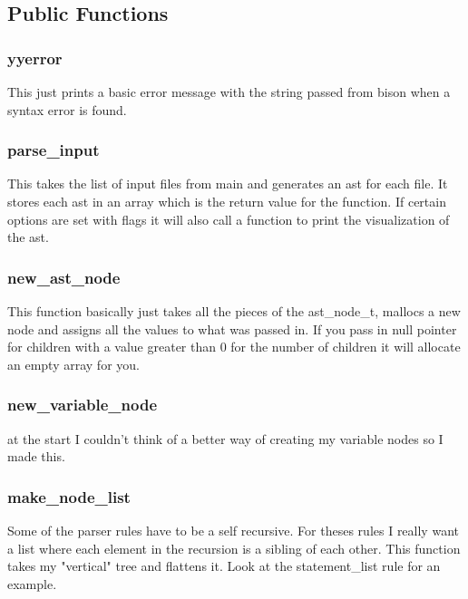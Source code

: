 \documentclass[11pt]{article}
\begin{document}
        \subsection{Public Functions}

            \subsubsection{yyerror}
                This just prints a basic error message with the string passed from bison when a syntax error is found.

            \subsubsection{parse\_input}
                This takes the list of input files from main and generates an ast for each file. It stores each ast in an array which 
                is the return value for the function. If certain options are set with flags it will also call a function to print
                the visualization of the ast.

            \subsubsection{new\_ast\_node}
                This function basically just takes all the pieces of the ast\_node\_t, mallocs a new node and assigns all the values to what was passed in.
                If you pass in null pointer for children with a value greater than 0 for the number of children it will allocate an empty array for you.

            \subsubsection{new\_variable\_node}
                at the start I couldn't think of a better way of creating my variable nodes so I made this.

            \subsubsection{make\_node\_list}
                Some of the parser rules have to be a self recursive. For theses
                rules I really want a list where each element in the recursion is a sibling
                of each other. This function takes my "vertical" tree and flattens it. 
                Look at the  statement\_list rule for an example.
\end{document}

